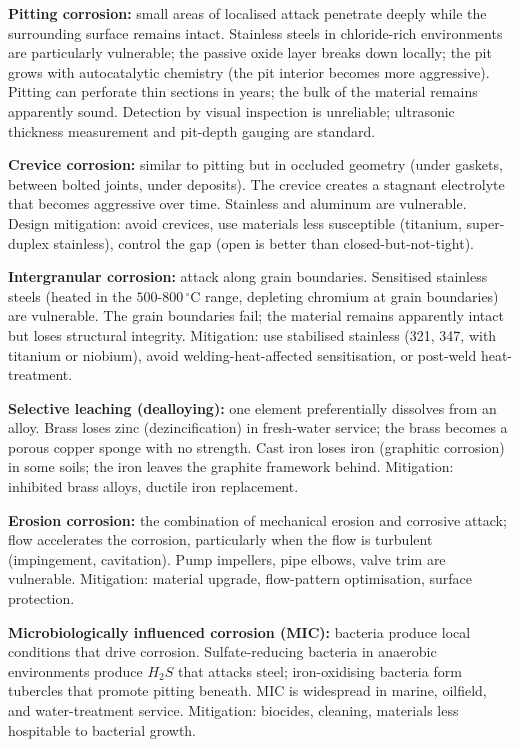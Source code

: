 \textbf{Pitting corrosion:} small areas of localised attack penetrate deeply while the surrounding surface remains intact. Stainless steels in chloride-rich environments are particularly vulnerable; the passive oxide layer breaks down locally; the pit grows with autocatalytic chemistry (the pit interior becomes more aggressive). Pitting can perforate thin sections in years; the bulk of the material remains apparently sound. Detection by visual inspection is unreliable; ultrasonic thickness measurement and pit-depth gauging are standard.

\textbf{Crevice corrosion:} similar to pitting but in occluded geometry (under gaskets, between bolted joints, under deposits). The crevice creates a stagnant electrolyte that becomes aggressive over time. Stainless and aluminum are vulnerable. Design mitigation: avoid crevices, use materials less susceptible (titanium, super-duplex stainless), control the gap (open is better than closed-but-not-tight).

\textbf{Intergranular corrosion:} attack along grain boundaries. Sensitised stainless steels (heated in the $500$-$800\,^\circ\text{C}$ range, depleting chromium at grain boundaries) are vulnerable. The grain boundaries fail; the material remains apparently intact but loses structural integrity. Mitigation: use stabilised stainless (321, 347, with titanium or niobium), avoid welding-heat-affected sensitisation, or post-weld heat-treatment.

\textbf{Selective leaching (dealloying):} one element preferentially dissolves from an alloy. Brass loses zinc (dezincification) in fresh-water service; the brass becomes a porous copper sponge with no strength. Cast iron loses iron (graphitic corrosion) in some soils; the iron leaves the graphite framework behind. Mitigation: inhibited brass alloys, ductile iron replacement.

\textbf{Erosion corrosion:} the combination of mechanical erosion and corrosive attack; flow accelerates the corrosion, particularly when the flow is turbulent (impingement, cavitation). Pump impellers, pipe elbows, valve trim are vulnerable. Mitigation: material upgrade, flow-pattern optimisation, surface protection.

\textbf{Microbiologically influenced corrosion (MIC):} bacteria produce local conditions that drive corrosion. Sulfate-reducing bacteria in anaerobic environments produce $H_2S$ that attacks steel; iron-oxidising bacteria form tubercles that promote pitting beneath. MIC is widespread in marine, oilfield, and water-treatment service. Mitigation: biocides, cleaning, materials less hospitable to bacterial growth.

